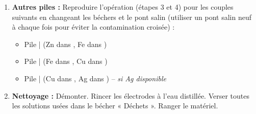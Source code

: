 \documentclass[11pt]{article}
\begin{document}
\begin{enumerate}
\begin{itemize}
        \item Si $U < 0$ : Inverser les fils sur le voltmètre ou inverser mentalement les pôles.
    \end{itemize}
    \item \textbf{Autres piles :} Reproduire l'opération (étapes 3 et 4) pour les couples suivants en changeant les béchers et le pont salin (utiliser un pont salin neuf à chaque fois pour éviter la contamination croisée) :
    \begin{itemize}
        \item Pile | (Zn dans , Fe dans )
        \item Pile | (Fe dans , Cu dans )
        \item Pile | (Cu dans , Ag dans ) -- \textit{si Ag disponible}
    \end{itemize}
    \item \textbf{Nettoyage :} Démonter. Rincer les électrodes à l'eau distillée. Verser toutes les solutions usées dans le bécher « Déchets ». Ranger le matériel.
\end{enumerate}
\end{document}
